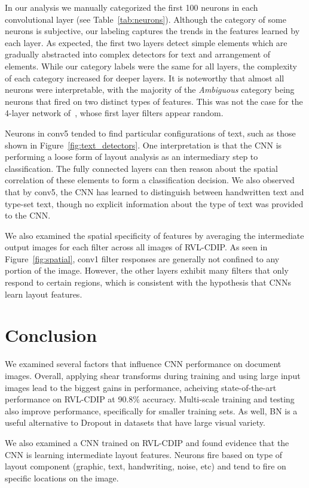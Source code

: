 \documentclass[10pt, conference, compsocconf]{IEEEtran}
\begin{document}
In our analysis we manually categorized the first 100 neurons in each convolutional layer (see Table~\ref{tab:neurons}).
Although the category of some neurons is subjective,
our labeling captures the trends in the features learned by each layer.
As expected, the first two layers detect simple elements which are gradually abstracted into complex detectors for text and arrangement of elements.
While our category labels were the same for all layers, the complexity of each category increased for deeper layers.
It is noteworthy that almost all neurons were interpretable, with the majority of the \emph{Ambiguous} category being neurons that fired on two distinct types of features.
This was not the case for the 4-layer network of~\cite{kang14}, whose first layer filters appear random.

Neurons in conv5 tended to find particular configurations of text, such as those shown in Figure~\ref{fig:text_detectors}.
One interpretation is that the CNN is performing a loose form of layout analysis as an intermediary step to classification.
The fully connected layers can then reason about the spatial correlation of these elements to form a classification decision.
We also observed that by conv5, the CNN has learned to distinguish between handwritten text and type-set text, though no explicit information about the type of text was provided to the CNN.

We also examined the spatial specificity of features by averaging the intermediate output images for each filter across all images of RVL-CDIP.
As seen in Figure~\ref{fig:spatial}, conv1 filter responses are generally not confined to any portion of the image.
However, the other layers exhibit many filters that only respond to certain regions, which is consistent with the hypothesis that CNNs learn layout features.

\section{Conclusion}

We examined several factors that influence CNN performance on document images.
Overall, applying shear transforms during training and using large input images lead to the biggest gains in performance, acheiving state-of-the-art performance on RVL-CDIP at 90.8\% accuracy.
Multi-scale training and testing also improve performance, specifically for smaller training sets.
As well, BN is a useful alternative to Dropout in datasets that have large visual variety.

We also examined a CNN trained on RVL-CDIP and found evidence that the CNN is learning intermediate layout features.
Neurons fire based on type of layout component (graphic, text, handwriting, noise, etc) and tend to fire on specific locations on the image.

{\tiny
\newcommand{\BIBdecl}{\setlength{\itemsep}{0.25 em}}



}
	
\end{document}
